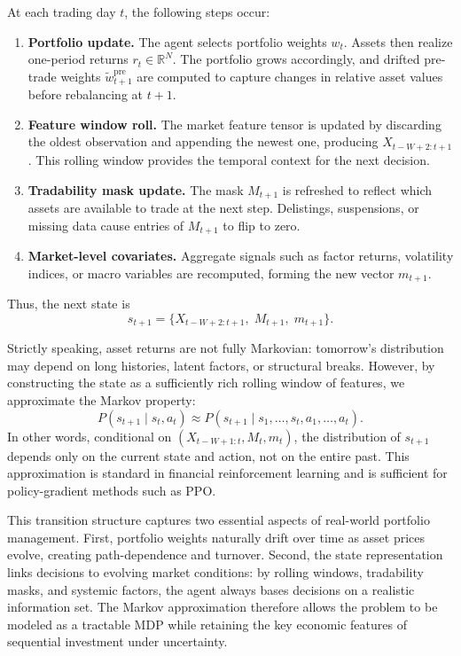 \documentclass[10pt,leqno]{amsart}
\begin{document}
At each trading day $t$, the following steps occur:
\begin{enumerate}
    \item \textbf{Portfolio update.} The agent selects portfolio weights $w_t$. Assets then realize one-period returns $r_t \in \mathbb{R}^N$. The portfolio grows accordingly, and drifted pre-trade weights $\tilde{w}_{t+1}^{\text{pre}}$ are computed to capture changes in relative asset values before rebalancing at $t{+}1$.
    \item \textbf{Feature window roll.} The market feature tensor is updated by discarding the oldest observation and appending the newest one, producing $X_{t-W+2:t+1}$. This rolling window provides the temporal context for the next decision.
    \item \textbf{Tradability mask update.} The mask $M_{t+1}$ is refreshed to reflect which assets are available to trade at the next step. Delistings, suspensions, or missing data cause entries of $M_{t+1}$ to flip to zero.
    \item \textbf{Market-level covariates.} Aggregate signals such as factor returns, volatility indices, or macro variables are recomputed, forming the new vector $m_{t+1}$.
\end{enumerate}

Thus, the next state is
\[
s_{t+1} = \{ X_{t-W+2:t+1}, \; M_{t+1}, \; m_{t+1} \}.
\]

Strictly speaking, asset returns are not fully Markovian: tomorrow’s distribution may depend on long histories, latent factors, or structural breaks. However, by constructing the state as a sufficiently rich rolling window of features, we approximate the Markov property:
\[
P(s_{t+1} \mid s_t, a_t) \approx P(s_{t+1} \mid s_1,\dots,s_t, a_1,\dots,a_t).
\]
In other words, conditional on $(X_{t-W+1:t}, M_t, m_t)$, the distribution of $s_{t+1}$ depends only on the current state and action, not on the entire past. This approximation is standard in financial reinforcement learning and is sufficient for policy-gradient methods such as PPO.

This transition structure captures two essential aspects of real-world portfolio management. First, portfolio weights naturally drift over time as asset prices evolve, creating path-dependence and turnover. Second, the state representation links decisions to evolving market conditions: by rolling windows, tradability masks, and systemic factors, the agent always bases decisions on a realistic information set. The Markov approximation therefore allows the problem to be modeled as a tractable MDP while retaining the key economic features of sequential investment under uncertainty.
\end{document}
